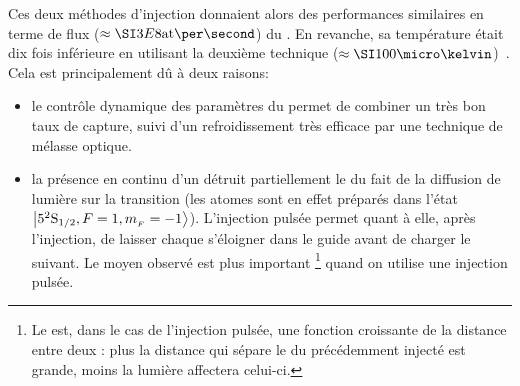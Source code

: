 \casse


Ces deux méthodes d'injection donnaient alors des performances similaires en terme de flux ($\approx \atparsec{3E8}$) du \jat. En revanche, sa température était dix fois inférieure en utilisant la deuxième technique ($\approx \microK{100}$)~\cite{RCL03}. Cela est principalement dû à deux raisons:
	\begin{itemize}
	\item le contrôle dynamique des paramètres du \pmo permet de combiner un très bon taux de capture, suivi d'un refroidissement très efficace par une technique de mélasse optique.%
	\item la présence en continu d'un \pmo détruit partiellement le \jgm du fait de la diffusion de lumière sur la transition  (les atomes sont en effet préparés dans l'état ${{\left| {{5^2 {\rm S}_{{1}/{2}}}, {F=1 , {m_{_F}}=-1} } \right\rangle}}$). L'injection pulsée permet quant à elle, après l'injection, de laisser chaque \p s'éloigner dans le guide avant de charger le \p suivant. Le \fat moyen observé est plus important%
	\footnote{Le \fat est, dans le cas de l'injection pulsée, une fonction croissante de la distance entre deux \pss: plus la distance qui sépare le \pmo du \p précédemment injecté est grande, moins la lumière  affectera celui-ci.} quand on utilise une injection pulsée.
\end{itemize}

